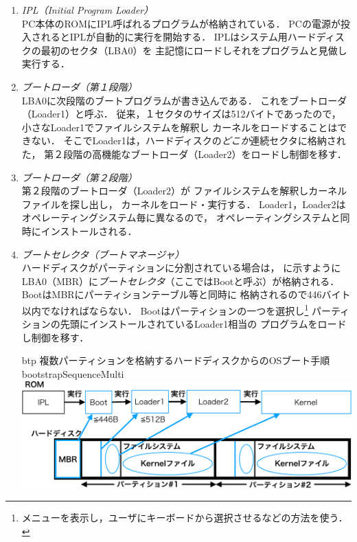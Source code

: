 \begin{enumerate}
\item \emph{IPL（Initial Program Loader）} \\
  PC本体のROMにIPL呼ばれるプログラムが格納されている．
  PCの電源が投入されるとIPLが自動的に実行を開始する．
  IPLはシステム用ハードディスクの最初のセクタ（LBA0）を
  主記憶にロードしそれをプログラムと見做し実行する．
\item \emph{ブートローダ（第１段階）} \\
  LBA0に次段階のブートプログラムが書き込んである．
  これをブートローダ（Loader1）と呼ぶ．
  従来，１セクタのサイズは512バイトであったので，
  小さなLoader1でファイルシステムを解釈し
  カーネルをロードすることはできない．
  そこでLoader1は，ハードディスクの\emph{どこか}連続セクタに格納された，
  第２段階の高機能なブートローダ（Loader2）をロードし制御を移す．
\item \emph{ブートローダ（第２段階）} \\
  第２段階のブートローダ（Loader2）が
  ファイルシステムを解釈しカーネルファイルを探し出し，
  カーネルをロード・実行する．
  Loader1，Loader2はオペレーティングシステム毎に異なるので，
  オペレーティングシステムと同時にインストールされる．
\item  \emph{ブートセレクタ（ブートマネージャ）} \\
  ハードディスクがパーティションに分割されている場合は，
  に示すように
  LBA0（MBR）に\emph{ブートセレクタ}（ここではBootと呼ぶ）が格納される．
  BootはMBRにパーティションテーブル等と同時に
  格納されるので446バイト以内でなければならない．
  Bootはパーティションの一つを選択し\footnote{
    メニューを表示し，ユーザにキーボードから選択させるなどの方法を使う．}
  パーティションの先頭にインストールされているLoader1相当の
  プログラムをロードし制御を移す．
  \begin{myfig}{btp}
    {複数パーティションを格納するハードディスクからのOSブート手順}
    {bootstrapSequenceMulti}
    \includegraphics[scale=0.66]{Fig/bootstrapSequenceMulti-crop.pdf}
  \end{myfig}
\end{enumerate}

